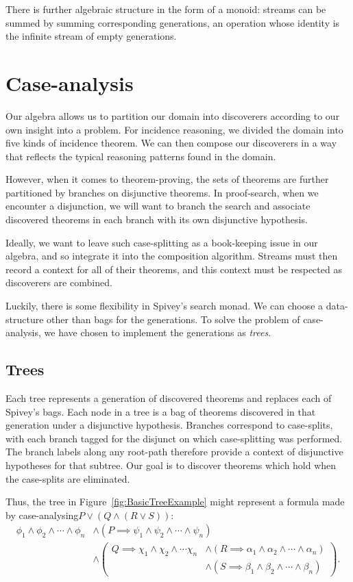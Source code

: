 There is further algebraic structure in the form of a monoid: streams can be summed by summing corresponding generations, an operation whose identity is the infinite stream of empty generations. 

\section{Case-analysis}
Our algebra allows us to partition our domain into discoverers according to our own insight into a problem. For incidence reasoning, we divided the domain into five kinds of incidence theorem. We can then compose our discoverers in a way that reflects the typical reasoning patterns found in the domain.

However, when it comes to theorem-proving, the sets of theorems are further partitioned by branches on disjunctive theorems. In proof-search, when we encounter a disjunction, we will want to branch the search and associate discovered theorems in each branch with its own disjunctive hypothesis. 

Ideally, we want to leave such case-splitting as a book-keeping issue in our algebra, and so integrate it into the composition algorithm. Streams must then record a context for all of their theorems, and this context must be respected as discoverers are combined. 

Luckily, there is some flexibility in Spivey's search monad. We can choose a data-structure other than bags for the generations. To solve the problem of case-analysis, we have chosen to implement the generations as \emph{trees}. 

\subsection{Trees}
Each tree represents a generation of discovered theorems and replaces each of Spivey's bags. Each node in a tree is a bag of theorems discovered in that generation under a disjunctive hypothesis. Branches correspond to case-splits, with each branch tagged for the disjunct on which case-splitting was performed. The branch labels along any root-path therefore provide a context of disjunctive hypotheses for that subtree. Our goal is to discover theorems which hold when the case-splits are eliminated.

Thus, the tree in Figure~\ref{fig:BasicTreeExample} might represent a formula made by case-analysing\linebreak \mbox{$P \vee (Q \wedge (R \vee S))$}:
\begin{align*}
\phi_1 \wedge \phi_2 \wedge \cdots \wedge \phi_n &\wedge (P \implies \psi_1 \wedge \psi_2 \wedge \cdots \wedge \psi_n)\\
&\wedge \left(\begin{aligned} Q \implies \chi_1 \wedge \chi_2 \wedge \cdots \chi_n &\wedge (R \implies \alpha_1 \wedge \alpha_2 \wedge \cdots \wedge \alpha_n)\\ &\wedge (S \implies \beta_1 \wedge \beta_2 \wedge \cdots \wedge \beta_n)\end{aligned}\right).
\end{align*}

